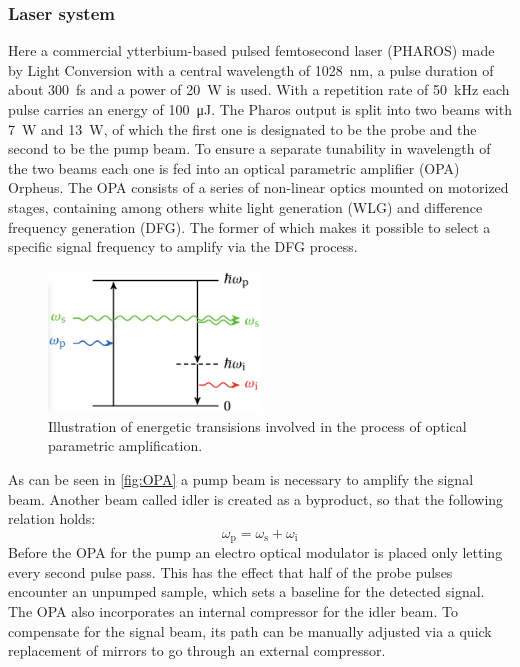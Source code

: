 \subsubsection*{Laser system}
Here a commercial ytterbium-based pulsed femtosecond laser (PHAROS) made by Light Conversion with a central wavelength of \qty{1028}{nm}, a pulse duration of about \qty{300}{fs} and a power of \qty{20}{W} is used.
With a repetition rate of \qty{50}{kHz} each pulse carries an energy of \qty{100}{\uJ}.
The Pharos output is split into two beams with \qty{7}{W} and \qty{13}{W}, of which the first one is designated to be the probe and the second to be the pump beam.
To ensure a separate tunability in wavelength of the two beams each one is fed into an optical parametric amplifier (OPA) Orpheus.
The OPA consists of a series of non-linear optics mounted on motorized stages, containing among others white light generation (WLG) and difference frequency generation (DFG).
The former of which makes it possible to select a specific signal frequency to amplify via the DFG process.
\begin{figure}[ht]
    \centering
    \includegraphics[width=0.5\textwidth]{pictures/OPA.png}
    \caption{Illustration of energetic transisions involved in the process of optical parametric amplification.}
    \label{fig:OPA}
\end{figure}
As can be seen in \autoref{fig:OPA} a pump beam is necessary to amplify the signal beam.
Another beam called idler is created as a byproduct, so that the following relation holds:
\begin{equation*}
    \omega_{\text{p}} = \omega_{\text{s}} + \omega_{\text{i}}
\end{equation*}
Before the OPA for the pump an electro optical modulator is placed only letting every second pulse pass.
This has the effect that half of the probe pulses encounter an unpumped sample, which sets a baseline for the detected signal.
The OPA also incorporates an internal compressor for the idler beam.
To compensate for the signal beam, its path can be manually adjusted via a quick replacement of mirrors to go through an external compressor.
